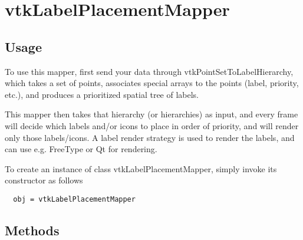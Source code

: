 \section{vtkLabelPlacementMapper}

\subsection{Usage}

 To use this mapper, first send your data through vtkPointSetToLabelHierarchy,
 which takes a set of points, associates special arrays to the points (label,
 priority, etc.), and produces a prioritized spatial tree of labels.

 This mapper then takes that hierarchy (or hierarchies) as input, and every
 frame will decide which labels and/or icons to place in order of priority,
 and will render only those labels/icons. A label render strategy is used to
 render the labels, and can use e.g. FreeType or Qt for rendering.

To create an instance of class vtkLabelPlacementMapper, simply
invoke its constructor as follows
\begin{verbatim}
  obj = vtkLabelPlacementMapper
\end{verbatim}
\subsection{Methods}

